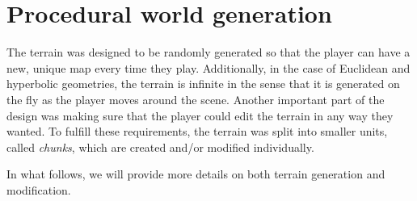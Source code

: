 \section{Procedural world generation} \label{sec:implementation_terrain}
The terrain was designed to be randomly generated so that the player can have a new, unique map every time they play.
Additionally, in the case of Euclidean and hyperbolic geometries, the terrain is infinite in the sense that it is generated on the fly as the player moves around the scene.
Another important part of the design was making sure that the player could edit the terrain in any way they wanted.
To fulfill these requirements, the terrain was split into smaller units, called \textit{chunks}, which are created and/or modified individually.

In what follows, we will provide more details on both terrain generation and modification.





